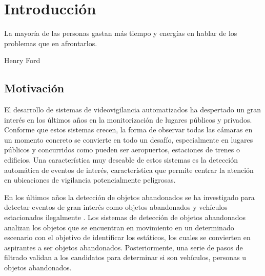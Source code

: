 
\chapter{Introducción}
\label{cha:introduccion}

\begin{FraseCelebre}
  \begin{Frase}
    La mayoría de las personas gastan más tiempo y energías en hablar de los problemas que en afrontarlos.
  \end{Frase}
  \begin{Fuente}
    Henry Ford
  \end{Fuente}
\end{FraseCelebre}

\section{Motivación}
\label{sec:motivacion}

El desarrollo de sistemas de videovigilancia automatizados ha despertado un gran interés en los últimos años en la monitorización de lugares públicos y privados. Conforme que estos sistemas crecen, la forma de observar todas las cámaras en un momento concreto se convierte en todo un desafío, especialmente en lugares públicos y concurridos como pueden ser aeropuertos, estaciones de trenes o edificios. Una característica muy deseable de estos sistemas es la detección automática de eventos de interés, característica que permite centrar la atención en ubicaciones de vigilancia potencialmente peligrosas.

En los últimos años la detección de objetos abandonados se ha investigado para detectar eventos de gran interés como objetos abandonados \cite{filonenko2016unattended} y vehículos estacionados ilegalmente \cite{Wahyono2017CumulativeDF}. Los sistemas de detección de objetos abandonados analizan los objetos que se encuentran en movimiento en un determinado escenario con el objetivo de identificar los estáticos, los cuales se convierten en aspirantes a ser objetos abandonados. Posteriormente, una serie de pasos de filtrado validan a los candidatos para determinar si son vehículos, personas u objetos abandonados.

